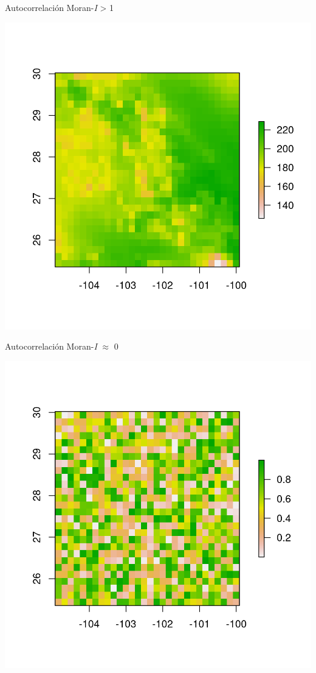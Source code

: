 \documentclass[
  11pt,
  ignorenonframetext,
]{beamer}
\begin{document}
\begin{frame}{Autocorrelación}
\protect\hypertarget{autocorrelaciuxf3n-1}{}
Moran-\emph{I} \textgreater{} 1

\begin{center}\includegraphics{Figuras/Moran-1-1} \end{center}
\end{frame}

\begin{frame}{Autocorrelación}
\protect\hypertarget{autocorrelaciuxf3n-2}{}
Moran-\emph{I} \(\approx\) 0

\begin{center}\includegraphics{Figuras/Moran-2-1} \end{center}
\end{frame}
\end{document}
